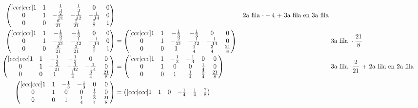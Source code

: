 \documentclass[letterpaper]{article}
\renewcommand{\*}{\cdot}
\theoremstyle{definition}
\begin{document}
\begin{align*}
\begin{pmatrix}[ccc|ccc]
	1 & 1 & -\frac{1}{3} & -\frac{1}{3} & 0 & 0\\
	0 & 1 & -\frac{2}{21} & -\frac{1}{42} & -\frac{1}{14} & 0\\
	0 & 0 & \frac{8}{21} & \frac{2}{21} & \frac{2}{7} & 1
	\end{pmatrix}  && \text{2a fila $ \* -4 $ + 3a fila en 3a fila } \\
	\begin{pmatrix}[ccc|ccc]
	1 & 1 & -\frac{1}{3} & -\frac{1}{3} & 0 & 0\\
	0 & 1 & -\frac{2}{21} & -\frac{1}{42} & -\frac{1}{14} & 0\\
	0 & 0 & \frac{8}{21} & \frac{2}{21} & \frac{2}{7} & 1
	\end{pmatrix}  & = \begin{pmatrix}[ccc|ccc]
	1 & 1 & -\frac{1}{3} & -\frac{1}{3} & 0 & 0\\
	0 & 1 & -\frac{2}{21} & -\frac{1}{42} & -\frac{1}{14} & 0\\
	0 & 0 & 1 & \frac{1}{4} & \frac{3}{4} & \frac{21}{8}
	\end{pmatrix}  && \text{3a fila } \* \frac{21}{8}\\
	\begin{pmatrix}[ccc|ccc]
	1 & 1 & -\frac{1}{3} & -\frac{1}{3} & 0 & 0\\
	0 & 1 & -\frac{2}{21} & -\frac{1}{42} & -\frac{1}{14} & 0\\
	0 & 0 & 1 & \frac{1}{4} & \frac{3}{4} & \frac{21}{8}
	\end{pmatrix} &= \begin{pmatrix}[ccc|ccc]
	1 & 1 & -\frac{1}{3} & -\frac{1}{3} & 0 & 0\\
	0 & 1 & 0 & 0 & \frac{1}{4} & 0\\
	0 & 0 & 1 & \frac{1}{4} & \frac{3}{4} & \frac{21}{8}
	\end{pmatrix} && \text{3a fila $ \* \frac{2}{21} $ + 2a fila en 2a fila}\\
	\begin{pmatrix}[ccc|ccc]
	1 & 1 & -\frac{1}{3} & -\frac{1}{3} & 0 & 0\\
	0 & 1 & 0 & 0 & \frac{1}{4} & 0\\
	0 & 0 & 1 & \frac{1}{4} & \frac{3}{4} & \frac{21}{8}
	\end{pmatrix}  &= \begin{pmatrix}[ccc|ccc]
	1 & 1 & 0 & -\frac{1}{4} & \frac{1}{4} & \frac{7}{8} \\

\end{pmatrix}
\end{align*}
\end{document}
